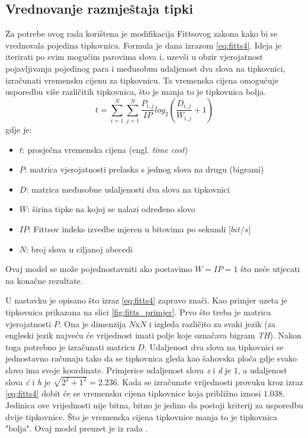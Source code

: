 \documentclass[times, utf8, zavrsni, numeric]{fer}
\begin{document}
\subsection{Vrednovanje razmještaja tipki}
Za potrebe ovog rada korištena je modifikacija Fittsovog zakona kako bi se vrednovala pojedina tipkovnica. Formula je dana izrazom \ref{eq:fitts4}. Ideja je iterirati po svim mogućim parovima slova i, uzevši u obzir vjerojatnost pojavljivanja pojedinog para i međusobnu udaljenost dva slova na tipkovnici, izračunati vremensku cijenu za tipkovnicu. Ta vremenska cijena omogućuje usporedbu više različitih tipkovnica, što je manja to je tipkovnica bolja.
\begin{equation}
\label{eq:fitts4}
t = \sum_{i=1}^{N}\sum_{j=1}^{N}\frac{P_{i,j}}{IP}log_2(\frac{D_{i,j}}{W_{i,j}} + 1)
\end{equation}
gdje je:
\begin{itemize}
\item $t$: prosječna vremenska cijena (engl. \emph{time cost})
\item $P$: matrica vjerojatnosti prelaska s jednog slova na drugu (bigrami)
\item $D$: matrica međusobne udaljenosti dva slova na tipkovnici
\item $W$: širina tipke na kojoj se nalazi određeno slovo
\item $IP$: Fittsov indeks izvedbe mjeren u bitovima po sekundi [$bit/s$]
\item $N$: broj slova u ciljanoj abecedi
\end{itemize}
Ovaj model se može pojednostavniti ako postavimo $W=IP=1$ što neće utjecati na konačne rezultate.

U nastavku je opisano što izraz \ref{eq:fitts4} zapravo znači. Kao primjer uzeta je tipkovnica prikazana na slici \ref{fig:fitts_primjer}. Prvo što treba je matrica vjerojatnosti $P$. Ona je dimenzija $N$x$N$ i izgleda različito za svaki jezik (za engleski jezik najveću će vrijednost imati polje koje označava bigram \emph{TH}). Nakon toga potrebno je izračunati matricu $D$. Udaljenost dva slova na tipkovnici se jednostavno računaju tako da se tipkovnica gleda kao šahovska ploča gdje svako slovo ima svoje koordinate. Primjerice udaljenost slova \emph{z} i \emph{d} je $1$, a udaljenost slova \emph{ć} i \emph{h} je $\sqrt{2^2+1^2} = 2.236$. Kada se izračunate vrijednosti provuku kroz izraz \ref{eq:fitts4} dobit će se vremensku cijena tipkovnice koja približno iznosi $1.038$. Jedinica ove vrijednosti nije bitna, bitno je jedino da postoji kriterij za usporedbu dvije tipkovnice. Što je vremenska cijena tipkovnice manja to je tipkovnica "bolja". Ovaj model preuzet je iz rada \cite{rad}.
\end{document}
